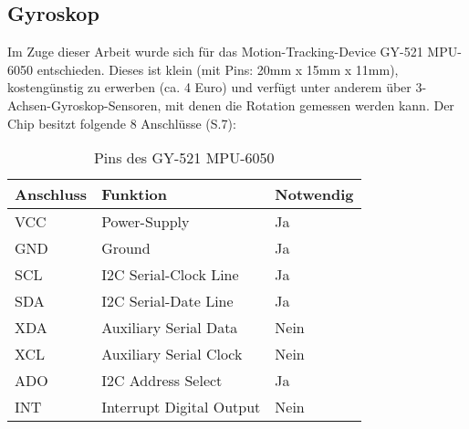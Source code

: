 \subsection{Gyroskop}
Im Zuge dieser Arbeit wurde sich für das Motion-Tracking-Device GY-521 MPU-6050 entschieden.
Dieses ist klein (mit Pins: 20mm x 15mm x 11mm), kostengünstig zu erwerben (ca. 4 Euro) und verfügt unter anderem über 3-Achsen-Gyroskop-Sensoren, mit denen die Rotation gemessen werden kann.
Der Chip besitzt folgende 8 Anschlüsse (S.7)\cite{az-delivery_vertriebs_gmbhGY5216AchsenGyroskop}:

\begin{table}[h]
    \centering
    \begin{threeparttable}
        \caption{Pins des GY-521 MPU-6050}
        \begin{tabular}{|l|l|l|}
            \hline
            \textbf{Anschluss}          & \textbf{Funktion}        & \textbf{Notwendig} \\ \hline
            \parbox[c][0.5cm]{2cm}{VCC} & Power-Supply             & Ja                 \\ \hline
            \parbox[c][0.5cm]{2cm}{GND} & Ground                   & Ja                 \\ \hline
            \parbox[c][0.5cm]{2cm}{SCL} & I2C Serial-Clock Line    & Ja                 \\ \hline
            \parbox[c][0.5cm]{2cm}{SDA} & I2C Serial-Date Line     & Ja                 \\ \hline
            \parbox[c][0.5cm]{2cm}{XDA} & Auxiliary Serial Data    & Nein               \\ \hline
            \parbox[c][0.5cm]{2cm}{XCL} & Auxiliary Serial Clock   & Nein               \\ \hline
            \parbox[c][0.5cm]{2cm}{ADO} & I2C Address Select       & Ja                 \\ \hline
            \parbox[c][0.5cm]{2cm}{INT} & Interrupt Digital Output & Nein               \\ \hline
        \end{tabular}
    \end{threeparttable}
\end{table}

